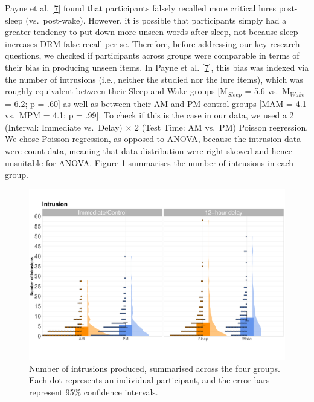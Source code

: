 \documentclass[
]{article}
\begin{document}
Payne et al. {[}\protect\hyperlink{ref-payne2009a}{7}{]} found that participants falsely recalled more critical lures post-sleep (vs.~post-wake). However, it is possible that participants simply had a greater tendency to put down more unseen words after sleep, not because sleep increases DRM false recall per se. Therefore, before addressing our key research questions, we checked if participants across groups were comparable in terms of their bias in producing unseen items. In Payne et al. {[}\protect\hyperlink{ref-payne2009a}{7}{]}, this bias was indexed via the number of intrusions (i.e., neither the studied nor the lure items), which was roughly equivalent between their Sleep and Wake groups {[}M\(_{Sleep}\) = 5.6 vs.~M\(_{Wake}\) = 6.2; p = .60{]} as well as between their AM and PM-control groups {[}MAM = 4.1 vs.~MPM = 4.1; p = .99{]}. To check if this is the case in our data, we used a 2 (Interval: Immediate vs.~Delay) \(\times\) 2 (Test Time: AM vs.~PM) Poisson regression. We chose Poisson regression, as opposed to ANOVA, because the intrusion data were count data, meaning that data distribution were right-skewed and hence unsuitable for ANOVA. Figure \ref{fig:intrusionfig} summarises the number of intrusions in each group.

\begin{figure}

{\centering \includegraphics{Figures/intrusiongraph} 

}

\caption{Number of intrusions produced, summarised across the four groups. Each dot represents an individual participant, and the error bars represent 95\% confidence intervals.}\label{fig:intrusionfig}
\end{figure}
\end{document}
